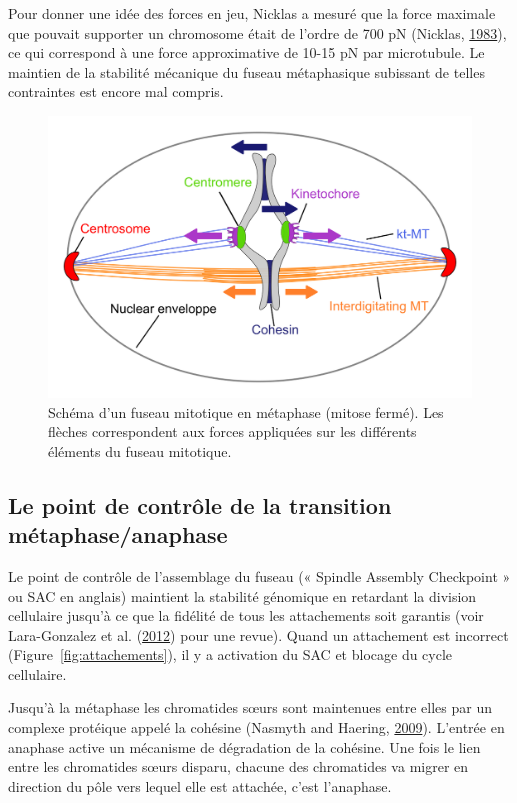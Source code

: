 \documentclass[12pt,a4paper,twoside,openright]{book}
\begin{document}
Pour donner une idée des forces en jeu, Nicklas a mesuré que la force
maximale que pouvait supporter un chromosome était de l'ordre de 700 pN
(Nicklas, \hyperref[ref-Nicklas1983]{1983}), ce qui correspond à une
force approximative de 10-15 pN par microtubule. Le maintien de la
stabilité mécanique du fuseau métaphasique subissant de telles
contraintes est encore mal compris.

\begin{figure}[htbp]
\centering
\includegraphics{figures/intro/spindle.png}
\caption[Schéma d'un fuseau mitotique en métaphase]{\label{fig:spindle}Schéma
d'un fuseau mitotique en métaphase (mitose fermé). Les flèches
correspondent aux forces appliquées sur les différents éléments du
fuseau mitotique.}
\end{figure}

\subsection{Le point de contrôle de la transition
métaphase/anaphase}\label{le-point-de-contruxf4le-de-la-transition-muxe9taphaseanaphase}

Le point de contrôle de l'assemblage du fuseau (« Spindle Assembly
Checkpoint » ou SAC en anglais) maintient la stabilité génomique en
retardant la division cellulaire jusqu'à ce que la fidélité de tous les
attachements soit garantis (voir Lara-Gonzalez et al.
(\hyperref[ref-Lara-Gonzalez2012]{2012}) pour une revue). Quand un
attachement est incorrect (Figure~\ref{fig:attachements}), il y a
activation du SAC et blocage du cycle cellulaire.

Jusqu'à la métaphase les chromatides sœurs sont maintenues entre elles
par un complexe protéique appelé la cohésine (Nasmyth and Haering,
\hyperref[ref-Nasmyth2009]{2009}). L'entrée en anaphase active un
mécanisme de dégradation de la cohésine. Une fois le lien entre les
chromatides sœurs disparu, chacune des chromatides va migrer en
direction du pôle vers lequel elle est attachée, c'est l'anaphase.
\end{document}
